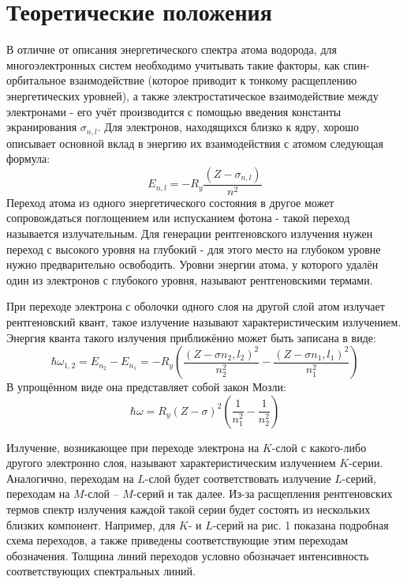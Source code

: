 \documentclass[a4paper]{article}
\begin{document}
\section{Теоретические положения}
В отличие от описания энергетического спектра атома водорода, для многоэлектронных систем необходимо учитывать такие факторы, как спин-орбитальное взаимодействие (которое приводит к тонкому расщеплению энергетических уровней), а также электростатическое взаимодействие между электронами - его учёт производится с помощью введения константы экранирования $\sigma_{n,l}$. Для электронов, находящихся близко к ядру, хорошо описывает основной вклад в энергию их взаимодействия с атомом следующая формула:
\begin{equation}
    E_{n,l} = -R_y \frac{(Z - \sigma_{n,l})}{n^2}
\end{equation}
Переход атома из одного энергетического состояния в другое может сопровождаться поглощением или испусканием фотона - такой переход называется излучательным. Для генерации рентгеновского излучения нужен переход с высокого уровня на глубокий - для этого место на глубоком уровне нужно предварительно освободить. Уровни энергии атома, у которого удалён один из электронов с глубокого уровня, называют рентгеновскими термами. \par
При переходе электрона с оболочки одного слоя на другой слой атом
излучает рентгеновский квант, такое излучение называют характеристическим излучением. Энергия кванта такого излучения приближённо может быть записана в виде:
\begin{equation}
    \hbar \omega_{1,2} = E_n_2 - E_n_1 = -R_y(\frac{(Z - \sigma{n_2,l_2})^2}{n_2^2} - \frac{(Z - \sigma{n_1,l_1})^2}{n_1^2})
\end{equation}
В упрощённом виде она представляет собой закон Мозли:
\begin{equation}
    \hbar \omega = R_y (Z - \sigma)^2 (\frac{1}{n_1^2} - \frac{1}{n_2^2})
\end{equation}

Излучение, возникающее при переходе электрона на $K$-слой с какого-либо
другого электронно слоя, называют характеристическим излучением
$K$-серии. Аналогично, переходам на $L$-слой будет соответствовать
излучение $L$-серий, переходам на $M$-слой – $M$-серий и так далее. Из-за расщепления рентгеновских термов спектр излучения каждой такой
серии будет состоять из нескольких близких компонент. Например, для
$K$- и $L$-серий на рис. 1 показана подробная схема переходов, а также приведены соответствующие этим переходам обозначения. Толщина линий переходов условно обозначает интенсивность соответствующих
спектральных линий.
\end{document}
